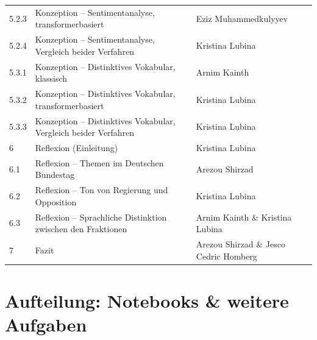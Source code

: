 \begin{center}
\begin{tabular}{@{}l p{8cm} l@{}}
    5.2.3 & Konzeption -- Sentimentanalyse, transformerbasiert & Eziz Muhammedkulyyev \\
    5.2.4 & Konzeption -- Sentimentanalyse, Vergleich beider Verfahren & Kristina Lubina \\
    5.3.1 & Konzeption -- Distinktives Vokabular, klassisch & Arnim Kainth \\
    5.3.2 & Konzeption -- Distinktives Vokabular, transformerbasiert & Kristina Lubina \\
    5.3.3 & Konzeption -- Distinktives Vokabular, Vergleich beider Verfahren & Kristina Lubina \\
    6     & Reflexion (Einleitung) & Kristina Lubina  \\
    6.1   & Reflexion -- Themen im Deutschen Bundestag & Arezou Shirzad \\
    6.2   & Reflexion -- Ton von Regierung und Opposition & Kristina Lubina \\
    6.3   & Reflexion -- Sprachliche Distinktion zwischen den Fraktionen & Arnim Kainth \& Kristina Lubina \\
    7     & Fazit &  Arezou Shirzad \& Jesco Cedric Homberg \\
    \bottomrule
  \end{tabular}
\end{center}

\vspace{5mm}

\section*{Aufteilung: Notebooks \& weitere Aufgaben}

